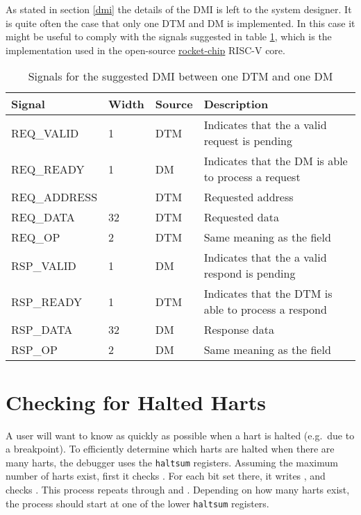 As stated in section \ref{dmi} the details of the DMI is left to the system designer.
It is quite often the case that only one DTM and DM is implemented.
In this case it might be useful to comply with the signals suggested in table \ref{tab:dmi_signals},
which is the implementation used in the open-source \href{https://github.com/chipsalliance/rocket-chip/blob/master/src/main/scala/devices/debug/Debug.scala#L170}{rocket-chip} RISC-V core.

\begin{table}[ht]\centering
	\begin{tabular}[h]{l l l l}
		\hline
		Signal 			& Width				& Source	& Description 		  \\
		\hline
		REQ\_VALID 		& 1					& DTM		& Indicates that the a valid request is pending \\
		\hline
		REQ\_READY 		& 1					& DM		& Indicates that the DM is able to process a request \\
		\hline
		REQ\_ADDRESS	& \FdtmDtmcsAbits	& DTM		& Requested address \\
		\hline
		REQ\_DATA		& 32				& DTM		& Requested data \\
		\hline
		REQ\_OP 		& 2					& DTM		& Same meaning as the \FdtmDmiOp field\\
		\hline
		RSP\_VALID 		& 1					& DM		& Indicates that the a valid respond is pending \\
		\hline
		RSP\_READY		& 1					& DTM		& Indicates that the DTM is able to process a respond \\
		\hline
		RSP\_DATA		& 32				& DM		& Response data \\
		\hline
		RSP\_OP			& 2					& DM		& Same meaning as the \FdtmDmiOp field\\
		\hline
	\end{tabular}
	\caption{Signals for the suggested DMI between one DTM and one DM \label{tab:dmi_signals}}
\end{table}

\section{Checking for Halted Harts}

A user will want to know as quickly as possible when a hart is halted (e.g.\ due
to a breakpoint).  To efficiently determine which harts are halted when there
are many harts, the debugger uses the {\tt haltsum} registers. Assuming the
maximum number of harts exist, first it checks \RdmHaltsumThree. For each bit set
there, it writes \Fhartsel, and checks \RdmHaltsumTwo. This process repeats
through \RdmHaltsumOne and \RdmHaltsumZero. Depending on how many harts exist, the
process should start at one of the lower {\tt haltsum} registers.

